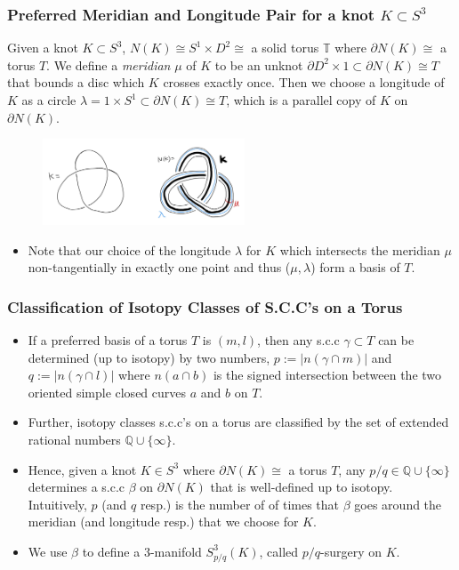 \documentclass{beamer}
\theoremstyle{ex}
\theoremstyle{rem}
\begin{document}
	\begin{frame}
		\frametitle{Preferred Meridian and Longitude Pair for a knot $K \subset S^3$}
		\begin{definition} 
		Given a knot $K \subset S^3$, $N(K) \cong S^1 \times D^2 \cong$ a solid torus $\mathbb{T}$ where $\partial N(K) \cong$ a torus $T$. We define a \textit{meridian} $\mu$ of $K$ to be an unknot $\partial D^2 \times {1} \subset \partial N(K) \cong T$ that bounds a disc which $K$ crosses exactly once. Then we choose a longitude of $K$ as a circle $\lambda = {1} \times S^1 \subset \partial N(K) \cong T$, which is a parallel copy of $K$ on $\partial N(K)$.
		\end{definition}
		\begin{figure}
			\centering
			\includegraphics[width=60mm]{N(K).jpg}
		\end{figure}
		\begin{itemize}
		\item Note that our choice of the longitude $\lambda$ for $K$ which intersects the meridian $\mu$ non-tangentially in exactly one point and thus ($\mu, \lambda$) form a basis of $T$.
		\end{itemize}
	\end{frame}	

	\begin{frame}
		\frametitle{Classification of Isotopy Classes of S.C.C's on a Torus}
		\begin{itemize}
		\item If a preferred basis of a torus $T$ is $(m, l)$, then any s.c.c $\gamma \subset T$ can be determined (up to isotopy) by two numbers, $p:=|n(\gamma \cap m)|$ and $q:=|n(\gamma \cap l)|$ where $n(a \cap b)$ is the signed intersection between the two oriented simple closed curves $a$ and $b$ on $T$. 
		\end{itemize}
		\begin{itemize}
		\item Further, isotopy classes s.c.c's on a torus are classified by the set of extended rational numbers $\mathbb{Q}\cup\{\infty\}$. 
		\end{itemize}		
		\begin{itemize}
		\item Hence, given a knot $K \in S^3$ where $\partial N(K) \cong$ a torus $T$, any $p/q \in \mathbb{Q}\cup\{\infty\}$ determines a s.c.c $\beta$ on $\partial N(K)$ that is well-defined up to isotopy. Intuitively, $p$ (and $q$ resp.) is the number of of times that $\beta$ goes around the meridian (and longitude resp.) that we choose for $K$. 
		\item We use $\beta$ to define a $3$-manifold $S^3_{p/q}(K)$, called $p/q$-surgery on $K$.
		\end{itemize}
	\end{frame}
\end{document}
